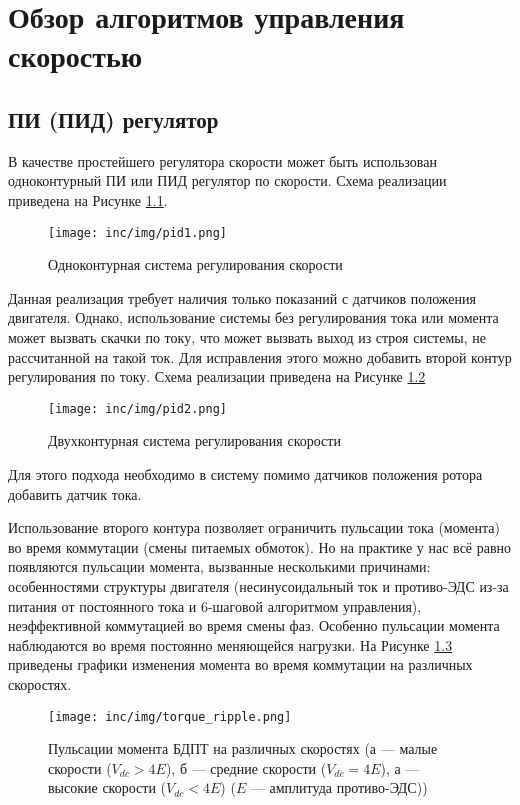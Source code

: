 \chapter{Обзор алгоритмов управления скоростью}
\label{cha:chap2}

\section{ПИ (ПИД) регулятор}
\label{sec:pid}

В качестве простейшего регулятора скорости может быть использован одноконтурный ПИ или ПИД регулятор по скорости. Схема реализации приведена на Рисунке \ref{pic:pid1}.

\begin{figure}[!h]
\centering
\texttt{[image: inc/img/pid1.png]}
\caption{Одноконтурная система регулирования скорости \cite{book.kim_motors}}
\label{pic:pid1}
\end{figure}

Данная реализация требует наличия только показаний с датчиков положения двигателя. Однако, использование системы без регулирования тока или момента может вызвать скачки по току, что может вызвать выход из строя системы, не рассчитанной на такой ток. Для исправления этого можно добавить второй контур регулирования по току. Схема реализации приведена на Рисунке \ref{pic:pid2}

\begin{figure}[!h]
\centering
\texttt{[image: inc/img/pid2.png]}
\caption{Двухконтурная система регулирования скорости \cite{book.kim_motors}}
\label{pic:pid2}
\end{figure}

Для этого подхода необходимо в систему помимо датчиков положения ротора добавить датчик тока.

Использование второго контура позволяет ограничить пульсации тока (момента) во время коммутации (смены питаемых обмоток). Но на практике у нас всё равно появляются пульсации момента, вызванные несколькими причинами: особенностями структуры двигателя (несинусоидальный ток и противо-ЭДС из-за питания от постоянного тока и 6-шаговой алгоритмом управления), неэффективной коммутацией во время смены фаз. Особенно пульсации момента наблюдаются во время постоянно меняющейся нагрузки. На Рисунке \ref{pic:commut} приведены графики изменения момента во время коммутации на различных скоростях.

\begin{figure}[!h]
\centering
\texttt{[image: inc/img/torque\_ripple.png]}
\caption{Пульсации момента БДПТ на различных скоростях (а --- малые скорости ($V_{dc}>4E$), б --- средние скорости ($V_{dc}=4E$), а --- высокие скорости ($V_{dc}<4E$) ($E$ --- амплитуда противо-ЭДС)) \cite{book.kim_motors}}
\label{pic:commut}
\end{figure}

